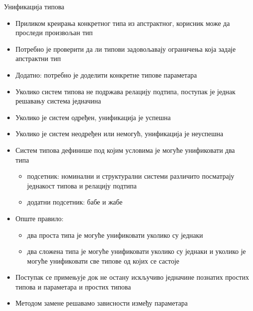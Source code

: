 \documentclass[xcolor=table]{beamer}
\begin{document}
    \begin{frame}[allowframebreaks]{Унификација типова}
        \begin{itemize}
            \item Приликом креирања конкретног типа из апстрактног, корисник може да проследи произвољан тип
            \item Потребно је проверити да ли типови задовољавају ограничења која задаје апстрактни тип
            \item Додатно: потребно је доделити конкретне типове параметара
        \end{itemize}

        \framebreak

        \begin{itemize}
            \item Уколико систем типова не подржава релацију подтипа, поступак је једнак решавању система једначина
            \item Уколико је систем одређен, унификација је успешна
            \item Уколико је систем неодређен или немогућ, унификација је неуспешна
        \end{itemize}

        \framebreak

        \begin{itemize}
            \item Систем типова дефинише под којим условима је могуће унификовати два типа
            \begin{itemize}
                \item подсетник: номинални и структурални системи различито посматрају једнакост типова и релацију подтипа
                \item додатни подсетник: бабе и жабе
            \end{itemize}
            \item Опште правило:
            \begin{itemize}
                \item два проста типа је могуће унификовати уколико су једнаки
                \item два сложена типа је могуће унификовати уколико су једнаки и уколико је могуће унификовати све типове од којих се састоје
            \end{itemize}
            \item Поступак се примењује док не остану искључиво једначине познатих простих типова и параметара и простих типова
            \item Методом замене решавамо зависности између параметара
        \end{itemize}
    \end{frame}
    
\end{document}
